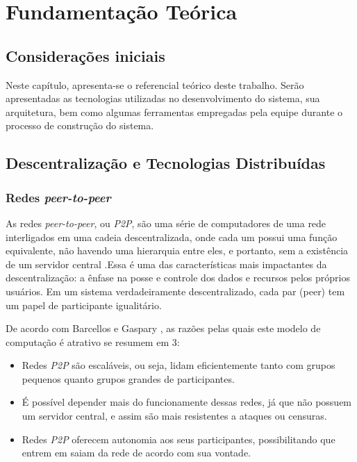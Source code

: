 \chapter[Fundamentação Teórica]{Fundamentação Teórica}
\label{cap:fundamentacao}

\section{Considerações iniciais}

Neste capítulo, apresenta-se o referencial teórico deste trabalho. Serão apresentadas as tecnologias utilizadas no desenvolvimento do sistema, sua arquitetura, bem como algumas ferramentas empregadas pela equipe durante o processo de construção do sistema.

\section{Descentralização e Tecnologias Distribuídas}

\subsection{Redes \textit{peer-to-peer}}
As redes \textit{peer-to-peer}, ou \textit{P2P}, são uma série de computadores de uma rede interligados em uma cadeia descentralizada, onde cada um possui uma função equivalente, não havendo uma hierarquia entre eles, e portanto, sem a existência de um servidor central \cite{otton2007}.Essa é uma das características mais impactantes da descentralização: a ênfase na posse e controle dos dados e recursos pelos próprios usuários. Em um sistema verdadeiramente descentralizado, cada par (peer) tem um papel de participante igualitário. \cite{oram2002}

De acordo com Barcellos e Gaspary \cite{barcellos2006}, as razões pelas quais este modelo de computação é atrativo se resumem em 3:
\begin{itemize}
    \item Redes \textit{P2P} são escaláveis, ou seja, lidam eficientemente tanto com grupos pequenos quanto grupos grandes de participantes. 
    \item É possível depender mais do funcionamente dessas redes, já que não possuem um servidor central, e assim são mais resistentes a ataques ou censuras.
    \item Redes \textit{P2P} oferecem autonomia aos seus participantes, possibilitando que entrem em saiam da rede de acordo com sua vontade. 
\end{itemize}

